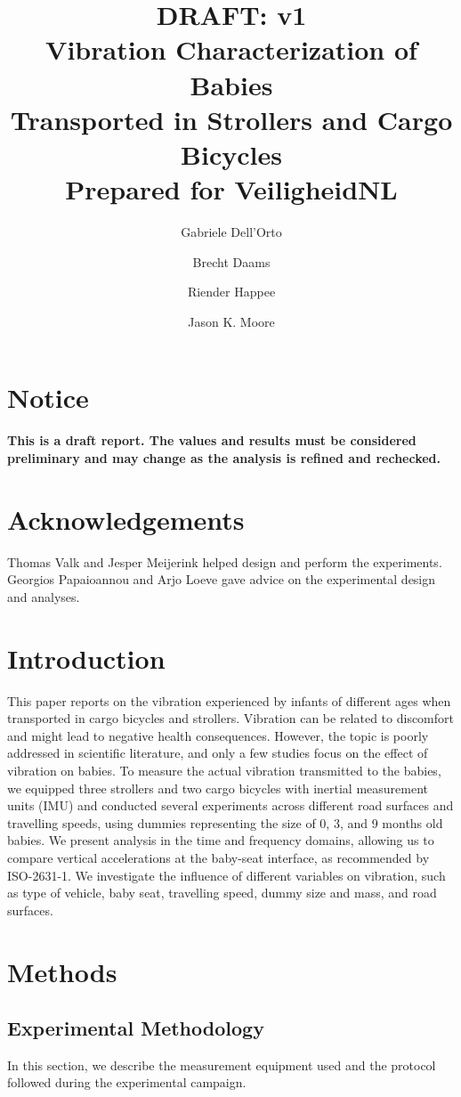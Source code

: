 \documentclass[a4paper]{article}
\title{
  DRAFT: v1 \\
  Vibration Characterization of Babies\\
  Transported in Strollers and Cargo Bicycles\\
  \vspace{2mm}
  \large{Prepared for VeiligheidNL}
}
\author{Gabriele Dell'Orto \and Brecht Daams \and Riender Happee \and Jason K. Moore}
\begin{document}
\maketitle

\section*{\centering Notice}
%
\textbf{This is a draft report. The values and results must be considered
preliminary and may change as the analysis is refined and rechecked.}

\section*{\centering Acknowledgements}
%
Thomas Valk and Jesper Meijerink helped design and perform the experiments.
Georgios Papaioannou and Arjo Loeve gave advice on the experimental design and
analyses.

\section{Introduction}
%
This paper reports on the vibration experienced by infants of different ages
when transported in cargo bicycles and strollers. Vibration can be related to
discomfort and might lead to negative health consequences. However, the topic is
poorly addressed in scientific literature, and only a few studies focus on the
effect of vibration on babies. To measure the actual vibration transmitted to
the babies, we equipped three strollers and two cargo bicycles with inertial
measurement units (IMU) and conducted several experiments across different road
surfaces and travelling speeds, using dummies representing the size of 0, 3, and
9 months old babies. We present analysis in the time and frequency domains,
allowing us to compare vertical accelerations at the baby-seat interface, as
recommended by ISO-2631-1. We investigate the influence of different variables
on vibration, such as type of vehicle, baby seat, travelling speed, dummy size
and mass, and road surfaces.

\section{Methods}
%
\subsection{Experimental Methodology}
%
In this section, we describe the measurement equipment used and the protocol
followed during the experimental campaign.
\end{document}
